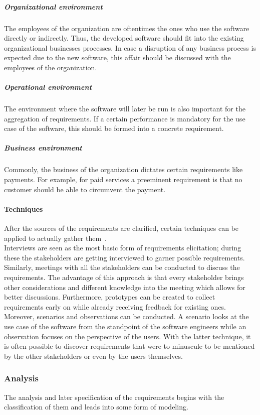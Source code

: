 \documentclass[12pt,a4paper]{report}
\begin{document}
\subparagraph{Organizational environment}
The employees of the organization are oftentimes the ones who use the software
directly or indirectly. Thus, the developed software should fit into the existing
organizational businesses processes. In case a disruption of any business process
is expected due to the new software, this affair should be discussed with the
employees of the organization.

\subparagraph{Operational environment}
The environment where the software will later be run is also important for the
aggregation of requirements. If a certain performance is mandatory for the use case
of the software, this should be formed into a concrete requirement.

\subparagraph{Business environment}
Commonly, the business of the organization dictates certain requirements like
payments. For example, for paid services a preeminent requirement is that
no customer should be able to circumvent the payment.


\paragraph{Techniques}
After the sources of the requirements are clarified, certain techniques can be
applied to actually gather them~\cite{sommerville-se, swebok}.\\
Interviews are seen as the most basic form of requirements elicitation;
during these the stakeholders are getting interviewed to garner possible requirements.
Similarly, meetings with all the stakeholders can be conducted to discuss the requirements.
The advantage of this approach is that every stakeholder brings other considerations and
different knowledge into the meeting which allows for better discussions.
Furthermore, prototypes can be created to collect requirements early on while already
receiving feedback for existing ones. Moreover, scenarios and observations can be
conducted. A scenario looks at the use case of the software from the standpoint
of the software engineers while an observation focuses on the perspective of the
users. With the latter technique, it is often possible to discover requirements
that were to minuscule to be mentioned by the other stakeholders or even by the users themselves.


\subsubsection{Analysis}

The analysis and later specification of the requirements begins with the classification
of them and leads into some form of modeling.
\end{document}
